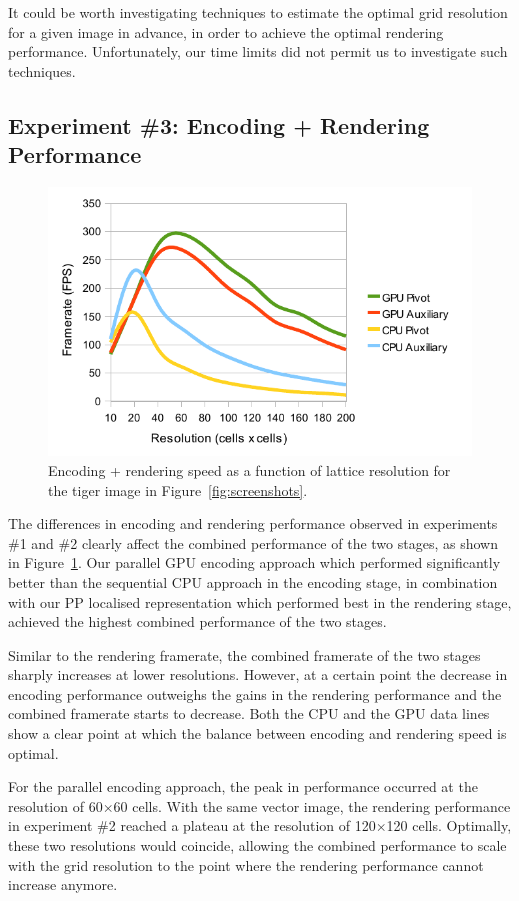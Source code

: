 \documentclass[11pt,a4paper,twoside]{article}
\begin{document}
It could be worth investigating techniques to estimate the optimal grid resolution for a given image in advance, in order to achieve the optimal rendering performance. Unfortunately, our time limits did not permit us to investigate such techniques.

\subsection {Experiment \#3: Encoding + Rendering Performance}

\begin {figure} [h]
	\centering
	\includegraphics[width=0.6\columnwidth] {figures/graph_grid_encode_render}
	\caption {Encoding + rendering speed as a function of lattice resolution for the tiger image in Figure~\ref{fig:screenshots}.}
	\label {fig:graph_grid_encode_render}
\end {figure}

The differences in encoding and rendering performance observed in experiments \#1  and \#2 clearly affect the combined performance of the two stages, as shown in Figure~\ref{fig:graph_grid_encode_render}. Our parallel GPU encoding approach which performed significantly better than the sequential CPU approach in the encoding stage, in combination with our PP localised representation which performed best in the rendering stage, achieved the highest combined performance of the two stages.

Similar to the rendering framerate, the combined framerate of the two stages sharply increases at lower resolutions. However, at a certain point the decrease in encoding performance outweighs the gains in the rendering performance and the combined framerate starts to decrease. Both the CPU and the GPU data lines show a clear point at which the balance between encoding and rendering speed is optimal.

For the parallel encoding approach, the peak in performance occurred at the resolution of 60$\times$60 cells. With the same vector image, the rendering performance in experiment \#2 reached a plateau at the resolution of 120$\times$120 cells. Optimally, these two resolutions would coincide, allowing the combined performance to scale with the grid resolution to the point where the rendering performance cannot increase anymore.
\end{document}
